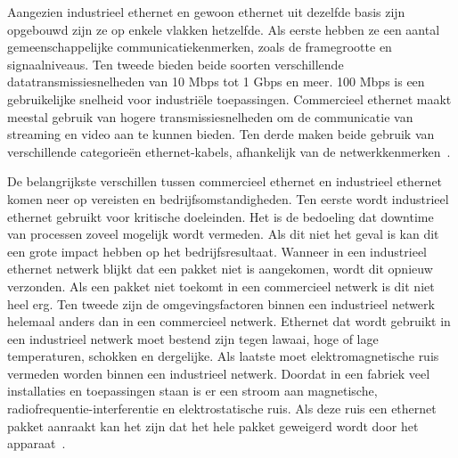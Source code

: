 Aangezien industrieel ethernet en gewoon ethernet uit dezelfde basis zijn opgebouwd zijn ze op enkele vlakken hetzelfde. Als eerste hebben ze een aantal gemeenschappelijke communicatiekenmerken, zoals de framegrootte en signaalniveaus. Ten tweede bieden beide soorten verschillende datatransmissiesnelheden van 10 Mbps tot 1 Gbps en meer. 100 Mbps is een gebruikelijke snelheid voor industriële toepassingen. Commercieel ethernet maakt meestal gebruik van hogere transmissiesnelheden om de communicatie van streaming en video aan te kunnen bieden. Ten derde maken beide gebruik van verschillende categorieën ethernet-kabels, afhankelijk van de netwerkkenmerken~\autocite{Tannehill2020}.

De belangrijkste verschillen tussen commercieel ethernet en industrieel ethernet komen neer op vereisten en bedrijfsomstandigheden. Ten eerste wordt industrieel ethernet gebruikt voor kritische doeleinden. Het is de bedoeling dat downtime van processen zoveel mogelijk wordt vermeden. Als dit niet het geval is kan dit een grote impact hebben op het bedrijfsresultaat. Wanneer in een industrieel ethernet netwerk blijkt dat een pakket niet is aangekomen, wordt dit opnieuw verzonden. Als een pakket niet toekomt in een commercieel netwerk is dit niet heel erg. Ten tweede zijn de omgevingsfactoren binnen een industrieel netwerk helemaal anders dan in een commercieel netwerk. Ethernet dat wordt gebruikt in een industrieel netwerk moet bestend zijn tegen lawaai, hoge of lage temperaturen, schokken en dergelijke. Als laatste moet elektromagnetische ruis vermeden worden binnen een industrieel netwerk. Doordat in een fabriek veel installaties en toepassingen staan is er een stroom aan magnetische, radiofrequentie-interferentie en elektrostatische ruis. Als deze ruis een ethernet pakket aanraakt kan het zijn dat het hele pakket geweigerd wordt door het apparaat~\autocite{Tannehill2020}.

